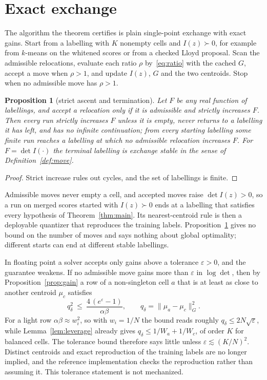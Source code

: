 \documentclass[11pt]{amsart}
\newtheorem{proposition}[theorem]{Proposition}
\theoremstyle{definition}
\theoremstyle{remark}
\newcommand{\Ib}{I(z)}
\begin{document}
\section{Exact exchange}\label{sec:alg}

The algorithm the theorem certifies is plain single-point exchange with exact gains. Start from a
labelling with $K$ nonempty cells and $\Ib\succ0$, for example from $k$-means on the whitened
scores or from a checked Lloyd proposal. Scan the admissible relocations, evaluate each ratio
$\rho$ by~\eqref{eq:ratio} with the cached $G$, accept a move when $\rho>1$, and update
$\Ib$, $G$ and the two centroids. Stop when no admissible move has $\rho>1$.

\begin{proposition}[strict ascent and termination]\label{prop:term}
Let $F$ be any real function of labellings, and accept a relocation only if it is admissible and
strictly increases $F$. Then every run strictly increases $F$ unless it is empty, never returns to
a labelling it has left, and has no infinite continuation; from every starting labelling some
finite run reaches a labelling at which no admissible relocation increases $F$. For
$F=\det I(\cdot)$ the terminal labelling is exchange stable in the sense of
Definition~\ref{def:move}.
\end{proposition}

\begin{proof}
Strict increase rules out cycles, and the set of labellings is finite.
\end{proof}

Admissible moves never empty a cell, and accepted moves raise $\det\Ib>0$, so a run on merged
scores started with $\Ib\succ0$ ends at a labelling that satisfies every hypothesis of
Theorem~\ref{thm:main}. Its nearest-centroid rule is then a deployable quantizer that reproduces the
training labels. Proposition~\ref{prop:term} gives no bound on the number of moves and says
nothing about global optimality; different starts can end at different stable labellings.

In floating point a solver accepts only gains above a tolerance $\varepsilon>0$, and the
guarantee weakens. If no admissible move gains more than $\varepsilon$ in $\log\det$, then by
Proposition~\ref{prop:gain} a row of a non-singleton cell $a$ that is at least as close to another
centroid $\mu_c$ satisfies
\[
q_\delta^2\ \le\ \frac{4\,(e^{\varepsilon}-1)}{\alpha\beta},\qquad q_\delta=\|\mu_a-\mu_c\|_G^2 .
\]
For a light row $\alpha\beta\approx w_i^2$, so with $w_i=1/N$ the bound reads roughly
$q_\delta\le2N\sqrt{\varepsilon}$, while Lemma~\ref{lem:leverage} already gives
$q_\delta\le1/W_a+1/W_c$, of order $K$ for balanced cells. The tolerance bound therefore says
little unless $\varepsilon\lesssim(K/N)^2$. Distinct centroids and exact reproduction of the
training labels are no longer implied, and the reference implementation checks the reproduction
rather than assuming it. This tolerance statement is not mechanized.
\end{document}
